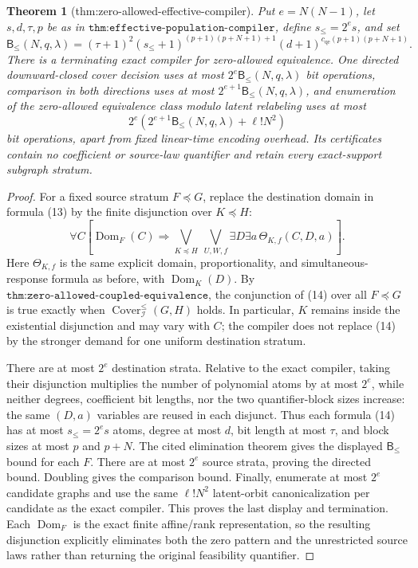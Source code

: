 \documentclass{article}
\newtheorem{theorem}{Theorem}
\begin{document}
\begin{theorem}[thm:zero-allowed-effective-compiler]\label{thm:zero-allowed-effective-compiler}
Put \(e=N(N-1)\), let \(s,d,\tau,p\) be as in \(\texttt{thm:effective-population-compiler}\), define \(s_{\le}=2^e s\), and set
\[
\mathsf B_{\le}(N,q,\lambda)
=(\tau+1)^2(s_{\le}+1)^{(p+1)(p+N+1)+1}
(d+1)^{c_{\mathrm{qe}}(p+1)(p+N+1)}.
\]
There is a terminating exact compiler for zero-allowed equivalence. One directed downward-closed cover decision uses at most \(2^e\mathsf B_{\le}(N,q,\lambda)\) bit operations, comparison in both directions uses at most \(2^{e+1}\mathsf B_{\le}(N,q,\lambda)\), and enumeration of the zero-allowed equivalence class modulo latent relabeling uses at most
\[
2^e\left(2^{e+1}\mathsf B_{\le}(N,q,\lambda)+\ell!N^2\right)
\]
bit operations, apart from fixed linear-time encoding overhead. Its certificates contain no coefficient or source-law quantifier and retain every exact-support subgraph stratum.
\end{theorem}
\begin{proof}
For a fixed source stratum \(F\preceq G\), replace the destination domain in formula (13) by the finite disjunction over \(K\preceq H\):
\[
\forall C\left[
\operatorname{Dom}_F(C)\Longrightarrow
\bigvee_{K\preceq H}\ \bigvee_{U,W,f}
\exists D\exists a\,\Theta_{K,f}(C,D,a)
\right]. \tag{14}
\]
Here \(\Theta_{K,f}\) is the same explicit domain, proportionality, and simultaneous-response formula as before, with \(\operatorname{Dom}_K(D)\). By \(\texttt{thm:zero-allowed-coupled-equivalence}\), the conjunction of (14) over all \(F\preceq G\) is true exactly when \(\operatorname{Cover}^{\le}_{\mathcal I}(G,H)\) holds. In particular, \(K\) remains inside the existential disjunction and may vary with \(C\); the compiler does not replace (14) by the stronger demand for one uniform destination stratum.

There are at most \(2^e\) destination strata. Relative to the exact compiler, taking their disjunction multiplies the number of polynomial atoms by at most \(2^e\), while neither degrees, coefficient bit lengths, nor the two quantifier-block sizes increase: the same \((D,a)\) variables are reused in each disjunct. Thus each formula (14) has at most \(s_{\le}=2^es\) atoms, degree at most \(d\), bit length at most \(\tau\), and block sizes at most \(p\) and \(p+N\). The cited elimination theorem gives the displayed \(\mathsf B_{\le}\) bound for each \(F\). There are at most \(2^e\) source strata, proving the directed bound. Doubling gives the comparison bound. Finally, enumerate at most \(2^e\) candidate graphs and use the same \(\ell!N^2\) latent-orbit canonicalization per candidate as the exact compiler. This proves the last display and termination. Each \(\operatorname{Dom}_F\) is the exact finite affine/rank representation, so the resulting disjunction explicitly eliminates both the zero pattern and the unrestricted source laws rather than returning the original feasibility quantifier.
\end{proof}
\end{document}
